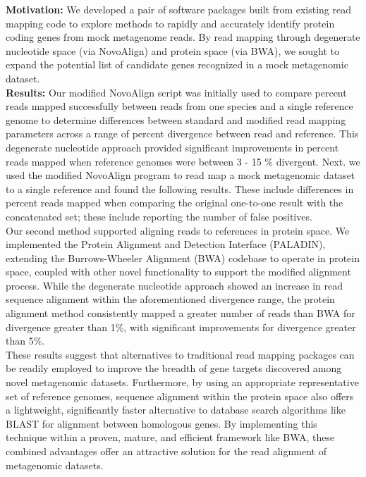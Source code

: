 \textbf{Motivation:} We developed a pair of software packages built from existing read mapping code to explore methods to rapidly and accurately identify protein coding genes from mock metagenome reads. By read mapping through degenerate nucleotide space (via NovoAlign) and protein space (via BWA), we sought to expand the potential list of candidate genes recognized in a mock metagenomic dataset.\\
\textbf{Results:} Our modified NovoAlign script was initially used to compare percent reads mapped successfully between reads from one species and a single reference genome to determine differences between standard and modified read mapping parameters across a range of percent divergence between read and reference. This degenerate nucleotide approach provided significant improvements in percent reads mapped when reference genomes were between 3 - 15 \% divergent. Next. we used the modified NovoAlign program to read map a mock metagenomic dataset to a single reference and found the following results. These include differences in percent reads mapped when comparing the original one-to-one result with the concatenated set; these include reporting the number of false positives. \\

Our second method supported aligning reads to references in protein space.  We implemented the Protein Alignment and Detection Interface (PALADIN), extending the Burrows-Wheeler Alignment (BWA) codebase to operate in protein space, coupled with other novel functionality to support the modified alignment process.  While  the degenerate nucleotide approach showed an increase in read sequence alignment within the aforementioned divergence range, the protein alignment method consistently mapped a greater number of reads than BWA for divergence greater than 1\%, with significant improvements for divergence greater than 5\%.  \\

These results suggest that alternatives to traditional read mapping packages can be readily employed to improve the breadth of gene targets discovered among novel metagenomic datasets. Furthermore, by using an appropriate representative set of reference genomes, sequence alignment within the protein space also offers a lightweight, significantly faster alternative to database search algorithms like BLAST for alignment between homologous genes.  By implementing this technique within a proven, mature, and efficient framework like BWA, these combined advantages offer an attractive solution for the read alignment of metagenomic datasets.